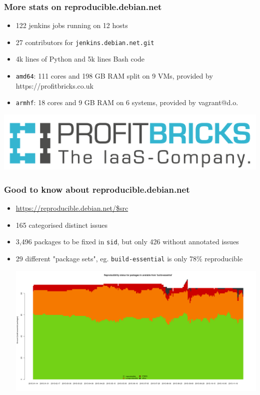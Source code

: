 \documentclass[14pt]{beamer}
\begin{document}
\begin{frame}
 \frametitle{More stats on reproducible.debian.net}

 \begin{itemize}
  \item 122 jenkins jobs running on 12 hosts
  \item 27 contributors for \texttt{jenkins.debian.net.git}
  \item 4k lines of Python and 5k lines Bash code
  \item \texttt{amd64}: 111 cores and 198 GB RAM split on 9 VMs, provided by
  https://profitbricks.co.uk
  \item \texttt{armhf}: 18 cores and 9 GB RAM on 6 systems, provided by vagrant@d.o.
 \end{itemize}
 \begin{center}
  \includegraphics[height=0.2\paperheight]{images/profitbricks_logo.png}
  \vfill
 \end{center}
\end{frame}

\begin{frame}
 \frametitle{Good to know about reproducible.debian.net}

 \begin{itemize}
  \item \url {https://reproducible.debian.net/$src}
  \item<2-3> { 165 categorised distinct issues }
  \item<2-3> { 3,496 packages to be fixed in \texttt{sid}, but only 426 without annotated
  issues }
  \item<3> { 29 different "package sets", eg. \texttt{build-essential} is only 78\%
  reproducible
   \begin{center}
    \includegraphics[height=0.5\paperheight]{images/stats_meta_pkg_state_build-essential.png}
   \vfill
 \end{center}
  }
 \end{itemize}
\end{frame}
\end{document}
